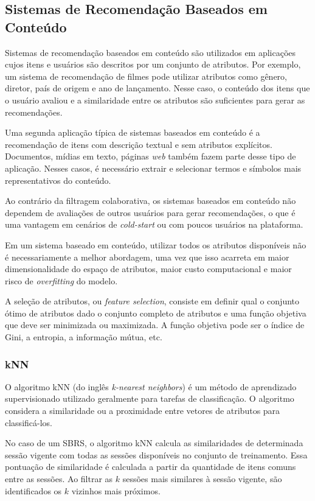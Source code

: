 \subsection{Sistemas de Recomendação Baseados em Conteúdo}

Sistemas de recomendação baseados em conteúdo são utilizados em aplicações cujos
itens e usuários são descritos por um conjunto de atributos. Por exemplo, um
sistema de recomendação de filmes pode utilizar atributos como gênero, diretor,
país de origem e ano de lançamento. Nesse caso, o conteúdo dos itens que o
usuário avaliou e a similaridade entre os atributos são
suficientes para gerar as recomendações.

Uma segunda aplicação típica de sistemas baseados em conteúdo é a recomendação
de itens com descrição textual e sem atributos explícitos. Documentos,
mídias em texto, páginas \textit{web} também fazem parte desse tipo de
aplicação. Nesses casos, é necessário extrair e selecionar termos e símbolos
mais representativos do conteúdo.


Ao contrário da filtragem colaborativa, os sistemas baseados em conteúdo não
dependem de avaliações de outros usuários para gerar recomendações, o que é uma
vantagem em cenários de \textit{cold-start} ou com poucos usuários na
plataforma.

Em um sistema baseado em conteúdo,
utilizar todos os atributos disponíveis não é necessariamente a melhor
abordagem, uma vez que isso acarreta em maior dimensionalidade do espaço de
atributos, maior custo computacional e maior risco de \textit{overfitting} do
modelo.


A seleção de atributos, ou \textit{feature selection}, consiste em definir qual
o conjunto ótimo de atributos dado o conjunto completo de
atributos e uma função objetiva que deve ser minimizada ou maximizada. A função
objetiva pode ser o índice de Gini, a entropia, a informação mútua, etc.

\subsubsection{kNN}
O algoritmo kNN (do inglês \textit{k-nearest neighbors}) é um método de
aprendizado supervisionado utilizado geralmente para tarefas de classificação. O
algoritmo considera a similaridade ou a proximidade entre vetores de atributos
para classificá-los.

No caso de um SBRS, o algoritmo kNN calcula as similaridades de determinada
sessão vigente com todas as sessões disponíveis no conjunto de treinamento. Essa
pontuação de similaridade é calculada a partir da quantidade de itens comuns
entre as sessões. Ao filtrar as $k$ sessões mais similares à sessão vigente, são
identificados os $k$ vizinhos mais próximos.

